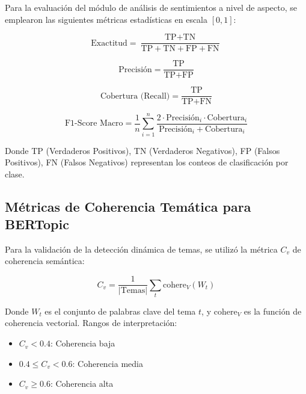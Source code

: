 \documentclass[listof=nochaptergap,12pt,times,authoryear]{report}
\begin{document}
Para la evaluación del módulo de análisis de sentimientos a nivel de aspecto, se emplearon las siguientes métricas estadísticas en escala $[0, 1]$:

\begin{equation}
\text{Exactitud} = \frac{\text{TP} + \text{TN}}{\text{TP} + \text{TN} + \text{FP} + \text{FN}}
\end{equation}

\begin{equation}
\text{Precisión} = \frac{\text{TP}}{\text{TP} + \text{FP}}
\end{equation}

\begin{equation}
\text{Cobertura (Recall)} = \frac{\text{TP}}{\text{TP} + \text{FN}}
\end{equation}

\begin{equation}
\text{F1-Score Macro} = \frac{1}{n}\sum_{i=1}^{n}\frac{2 \cdot \text{Precisión}_i \cdot \text{Cobertura}_i}{\text{Precisión}_i + \text{Cobertura}_i}
\end{equation}

Donde TP (Verdaderos Positivos), TN (Verdaderos Negativos), FP (Falsos Positivos), FN (Falsos Negativos) representan los conteos de clasificación por clase.

\subsection{Métricas de Coherencia Temática para BERTopic}

Para la validación de la detección dinámica de temas, se utilizó la métrica $C_v$ de coherencia semántica:

\begin{equation}
C_v = \frac{1}{|\text{Temas}|}\sum_{t}\text{cohere}_V(W_t)
\end{equation}

Donde $W_t$ es el conjunto de palabras clave del tema $t$, y $\text{cohere}_V$ es la función de coherencia vectorial. Rangos de interpretación:
\begin{itemize}
	\item $C_v < 0.4$: Coherencia baja
	\item $0.4 \leq C_v < 0.6$: Coherencia media
	\item $C_v \geq 0.6$: Coherencia alta
\end{itemize}

\clearpage

\end{document}
